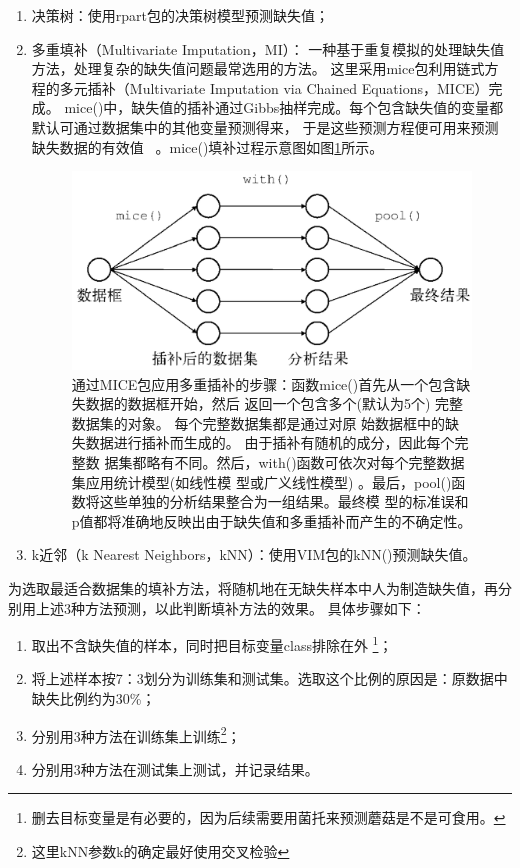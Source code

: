 \documentclass[lang=cn,11pt,a4paper,cite=super]{elegantpaper}
\begin{document}
\begin{enumerate}
   \item 决策树：使用rpart包的决策树模型预测缺失值；
   \item 多重填补（Multivariate Imputation，MI）：
   一种基于重复模拟的处理缺失值方法，处理复杂的缺失值问题最常选用的方法。
   这里采用mice包利用链式方程的多元插补（Multivariate Imputation via Chained Equations，MICE）完成。
   mice()中，缺失值的插补通过Gibbs抽样完成。每个包含缺失值的变量都默认可通过数据集中的其他变量预测得来， 
   于是这些预测方程便可用来预测缺失数据的有效值 ~\cite{ria}。mice()填补过程示意图如图\ref{fig:mice}所示。
   \begin{figure}[!htbp]
      \centering
      \includegraphics[width=0.7\linewidth]{img/mice.jpg}
      \caption{通过MICE包应用多重插补的步骤：函数mice()首先从一个包含缺失数据的数据框开始，然后
      返回一个包含多个(默认为5个) 完整数据集的对象。 每个完整数据集都是通过对原
      始数据框中的缺失数据进行插补而生成的。 由于插补有随机的成分，因此每个完整数
      据集都略有不同。然后，with()函数可依次对每个完整数据集应用统计模型(如线性模
      型或广义线性模型) 。最后，pool()函数将这些单独的分析结果整合为一组结果。最终模
      型的标准误和p值都将准确地反映出由于缺失值和多重插补而产生的不确定性。}
      \label{fig:mice}
   \end{figure}

   \item k近邻（k Nearest Neighbors，kNN）：使用VIM包的kNN()预测缺失值。
\end{enumerate}
\par 为选取最适合数据集的填补方法，将随机地在无缺失样本中人为制造缺失值，再分别用上述3种方法预测，以此判断填补方法的效果。
具体步骤如下：
\begin{enumerate}
   \item 取出不含缺失值的样本，同时把目标变量class排除在外
   \footnote{删去目标变量是有必要的，因为后续需要用菌托来预测蘑菇是不是可食用。}；
   \item 将上述样本按7：3划分为训练集和测试集。选取这个比例的原因是：原数据中缺失比例约为30\%；
   \item 分别用3种方法在训练集上训练\footnote{这里kNN参数k的确定最好使用交叉检验}；
   \item 分别用3种方法在测试集上测试，并记录结果。
\end{enumerate}
\end{document}
